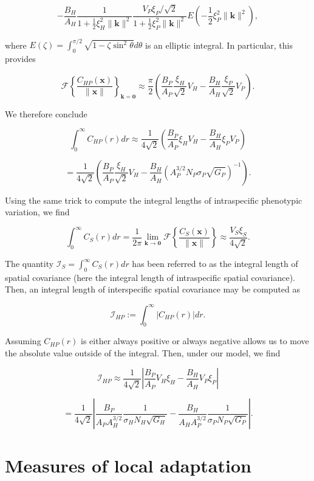 \documentclass{article}
\begin{document}
\[-\frac{B_H}{A_H}\frac{1}{1+\frac{1}{2}\xi_H^2\|\pmb k\|^2} \frac{V_P\xi_P/\sqrt2}{1+\frac{1}{2}\xi_P^2\|\pmb k\|^2}E\left(-\frac{1}{2}\xi_P^2\|\pmb k\|^2\right),\]

where \(E(\zeta)=\int_0^{\pi/2}\sqrt{1-\zeta\sin^2\theta}d\theta\) is an
elliptic integral. In particular, this provides

\[\mathcal F\left\{\frac{C_{HP}(\pmb x)}{\|\pmb x\|}\right\}_{\pmb k=\pmb 0}\approx\frac{\pi}{2}\left(\frac{B_P}{A_P}\frac{\xi_H}{\sqrt2}V_H-\frac{B_H}{A_H}\frac{\xi_P}{\sqrt2}V_P\right).\]

We therefore conclude

\[\int_0^\infty C_{HP}(r)dr\approx\frac{1}{4\sqrt2}\left(\frac{B_P}{A_P}\xi_HV_H-\frac{B_H}{A_H}\xi_PV_P\right)\]

\[=\frac{1}{4\sqrt2}\left(\frac{B_P}{A_P}\frac{\xi_H}{\sqrt2}V_H-\frac{B_H}{A_H}\left(A_P^{3/2}N_P\sigma_P\sqrt{G_P}\right)^{-1}\right).\]

Using the same trick to compute the integral lengths of intraspecific
phenotypic variation, we find

\[\int_0^\infty C_S(r)dr=\frac{1}{2\pi}\lim_{\pmb k\to\pmb 0}\mathcal F\left\{\frac{C_S(\pmb x)}{\|\pmb x\|}\right\}\approx\frac{V_S\xi_S}{4\sqrt2}.\]

The quantity \(\mathcal I_S=\int_0^\infty C_S(r)dr\) has been referred
to as the integral length of spatial covariance (here the integral
length of intraspecific spatial covariance). Then, an integral length of
interspecific spatial covariance may be computed as

\[\mathcal I_{HP}:=\int_0^\infty |C_{HP}(r)|dr.\]

Assuming \(C_{HP}(r)\) is either always positive or always negative
allows us to move the absolute value outside of the integral. Then,
under our model, we find

\[\mathcal I_{HP}\approx\frac{1}{4\sqrt2}\left|\frac{B_P}{A_P}V_H\xi_H-\frac{B_H}{A_H}V_P\xi_P\right|\]

\[=\frac{1}{4\sqrt2}\left|\frac{B_P}{A_PA_H^{3/2}}\frac{1}{\sigma_H N_H\sqrt{G_H}}-\frac{B_H}{A_HA_P^{3/2}}\frac{1}{\sigma_P N_P\sqrt{G_P}}\right|.\]

\hypertarget{measures-of-local-adaptation}{%
\section{\texorpdfstring{Measures of local adaptation
\label{la-app}}{Measures of local adaptation }}\label{measures-of-local-adaptation}}
\end{document}
